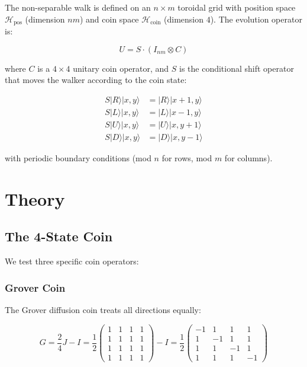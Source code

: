 \documentclass[12pt]{article}
\begin{document}
The non-separable walk is defined on an $n \times m$ toroidal grid with position space $\mathcal{H}_{\text{pos}}$ (dimension $nm$) and coin space $\mathcal{H}_{\text{coin}}$ (dimension $4$). The evolution operator is:

\[
U = S \cdot (I_{nm} \otimes C)
\]

where $C$ is a $4 \times 4$ unitary coin operator, and $S$ is the conditional shift operator that moves the walker according to the coin state:

\begin{align}
S|R\rangle|x,y\rangle &= |R\rangle|x+1,y\rangle \\
S|L\rangle|x,y\rangle &= |L\rangle|x-1,y\rangle \\
S|U\rangle|x,y\rangle &= |U\rangle|x,y+1\rangle \\
S|D\rangle|x,y\rangle &= |D\rangle|x,y-1\rangle
\end{align}

with periodic boundary conditions (mod $n$ for rows, mod $m$ for columns).

\section{Theory}

\subsection{The 4-State Coin}

We test three specific coin operators:

\subsubsection{Grover Coin}

The Grover diffusion coin treats all directions equally:

\[
G = \frac{2}{4}J - I = \frac{1}{2}\begin{pmatrix}
1 & 1 & 1 & 1 \\
1 & 1 & 1 & 1 \\
1 & 1 & 1 & 1 \\
1 & 1 & 1 & 1
\end{pmatrix} - I = \frac{1}{2}\begin{pmatrix}
-1 & 1 & 1 & 1 \\
1 & -1 & 1 & 1 \\
1 & 1 & -1 & 1 \\
1 & 1 & 1 & -1
\end{pmatrix}
\]
\end{document}
